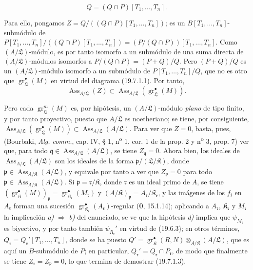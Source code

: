 \begin{equation}
  Q=(Q\cap P)[T_1,\ldots,T_n].
  \tag{19.7.1.3}\label{IV.19.7.1.3}
\end{equation}


Para ello, pongamos $Z=Q/((Q\cap P)[T_1,\ldots,T_n])$; es un $B[T_1,\ldots,T_n]$-submódulo de
$P[T_1,\ldots,T_n]/((Q\cap P)[T_1,\ldots,T_n])=(P/(Q\cap P))[T_1,\ldots,T_n]$.
Como $(A/\mathfrak L)$-módulo, es por tanto isomorfo a un submódulo de una suma directa de $(A/\mathfrak L)$-módulos isomorfos a $P/(Q\cap P)=(P+Q)/Q$. Pero $(P+Q)/Q$ es un $(A/\mathfrak L)$-módulo isomorfo a un submódulo de $P[T_1,\ldots,T_n]/Q$, que no es otro que $\operatorname{gr}_{\mathfrak L}^\bullet(M)$ en virtud del diagrama (19.7.1.1). Por tanto,
\begin{equation}
  \operatorname{Ass}_{A/\mathfrak L}(Z)\subset\operatorname{Ass}_{A/\mathfrak L}(\operatorname{gr}_{\mathfrak L}^\bullet(M)).
  \tag{19.7.1.4}\label{IV.19.7.1.4}
\end{equation}

Pero cada $\operatorname{gr}_{\mathfrak L}^m(M)$ es, por hipótesis, un $(A/\mathfrak L)$-módulo \emph{plano} de tipo finito, y por tanto proyectivo, puesto que $A/\mathfrak L$ es noetheriano; se tiene, por consiguiente, $\operatorname{Ass}_{A/\mathfrak L}(\operatorname{gr}_{\mathfrak L}^\bullet(M))\subset\operatorname{Ass}_{A/\mathfrak L}(A/\mathfrak L)$. Para ver que $Z=0$, basta, pues, (Bourbaki, \emph{Alg. comm.}, cap. IV, § 1, n\textsuperscript{o} 1, cor. 1 de la prop. 2 y n\textsuperscript{o} 3, prop. 7) ver que, para todo $\mathfrak q\in\operatorname{Ass}_{A/\mathfrak L}(A/\mathfrak L)$, se tiene $Z_{\mathfrak q}=0$. Ahora bien, los ideales de $\operatorname{Ass}_{A/\mathfrak L}(A/\mathfrak L)$ son los ideales de la forma $\mathfrak p/(\mathfrak L/\mathfrak K)$, donde $\mathfrak p\in\operatorname{Ass}_{A/\mathfrak K}(A/\mathfrak L)$, y equivale por tanto a ver que $Z_{\mathfrak p}=0$ para todo $\mathfrak p\in\operatorname{Ass}_{A/\mathfrak K}(A/\mathfrak L)$. Si $\mathfrak p=\mathfrak r/\mathfrak K$, donde $\mathfrak r$ es un ideal primo de $A$, se tiene $(\operatorname{gr}_{\mathfrak K}^\bullet(M))_{\mathfrak p}=\operatorname{gr}_{\mathfrak K_{\mathfrak r}}^\bullet(M_{\mathfrak r})$ y $(A/\mathfrak K)_{\mathfrak p}=A_{\mathfrak r}/\mathfrak K_{\mathfrak r}$, y las imágenes de los $f_i$ en $A_{\mathfrak r}$ forman una sucesión $\operatorname{gr}_{\mathfrak K_{\mathfrak r}}^\bullet(A_{\mathfrak r})$-regular (\textbf{0}, 15.1.14); aplicando a $A_{\mathfrak r}$, $\mathfrak K_{\mathfrak r}$ y $M_{\mathfrak r}$ la implicación \emph{a)} $\Rightarrow$ \emph{b)} del enunciado, se ve que la hipótesis \emph{d)} implica que $\psi_{M_{\mathfrak r}}$ es biyectivo, y por tanto también $\psi_{R_{\mathfrak r}}'$ en virtud de (19.6.3); en otros términos, $Q_{\mathfrak r}=Q_{\mathfrak r}'[T_1,\ldots,T_n]$, donde se ha puesto $Q'=\operatorname{gr}_{\mathfrak K}^\bullet(R,N)\otimes_{A/\mathfrak K}(A/\mathfrak L)$, que es aquí un $B$-submódulo de $P$; en particular, $Q_{\mathfrak r}'=Q_{\mathfrak r}\cap P_{\mathfrak r}$, de modo que finalmente se tiene $Z_{\mathfrak r}=Z_{\mathfrak p}=0$, lo que termina de demostrar (19.7.1.3).

